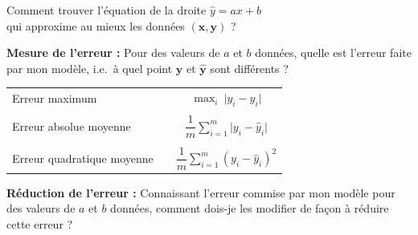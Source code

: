 \documentclass[aspectratio=169]{beamer}
\begin{document}
\begin{frame}
  \vfill
  \centering

  Comment trouver l'équation de la droite $\hat{y} = ax + b$ \\
  qui approxime au mieux les données $(\bm{x}, \bm{y})$ ?

  \vfill
\end{frame}

\begin{frame}
  \vfill
  \textbf{Mesure de l'erreur :} Pour des valeurs de $a$ et $b$ données, quelle est l'erreur faite par mon modèle, i.e.\ à quel point $\bm{y}$ et $\hat{\bm{y}}$ sont différents ?
  \vfill
\end{frame}

\begin{frame}
  \vfill
  \centering
  \begin{tabular}{lcc}
    Erreur maximum & \quad & $\displaystyle \max_i \  \vert y_i - \hat{y}_i \vert$ \\
    \\
    Erreur absolue moyenne & \quad & $\displaystyle \dfrac{1}{m} \sum_{i=1}^m \vert y_i - \hat{y}_i \vert$ \\
    \\
    Erreur quadratique moyenne & \quad & $\displaystyle \dfrac{1}{m} \sum_{i=1}^m \left( y_i - \hat{y}_i \right)^2$
  \end{tabular}
  \vfill
\end{frame}

\begin{frame}
  \vfill
  \textbf{Réduction de l'erreur :} Connaissant l'erreur commise par mon modèle pour des valeurs de $a$ et $b$ données, comment dois-je les modifier de façon à réduire cette erreur ?
  \vfill
\end{frame}

\begin{frame}
  \centering
\end{frame}
\end{document}
